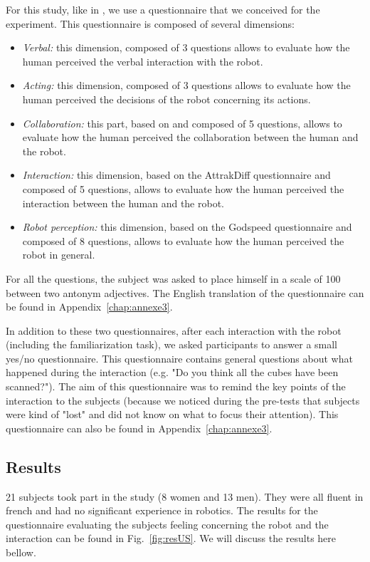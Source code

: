\documentclass[english,a4paper,11pt,twoside]{StyleThese}
\begin{document}
For this study, like in \cite{heerink2010relating, fischer2016between}, we use a questionnaire that we conceived for the experiment. This questionnaire is composed of several dimensions:
\begin{itemize}
\item \textit{Verbal:} this dimension, composed of 3 questions allows to evaluate how the human perceived the verbal interaction with the robot.
\item \textit{Acting:} this dimension, composed of 3 questions allows to evaluate how the human perceived the decisions of the robot concerning its actions.
\item \textit{Collaboration:} this part, based on \cite{weistroffer2014etude} and composed of 5 questions, allows to evaluate how the human perceived the collaboration between the human and the robot.
\item \textit{Interaction:} this dimension, based on the AttrakDiff questionnaire \cite{lallemand2015creation} and composed of 5 questions, allows to evaluate how the human perceived the interaction between the human and the robot.
\item \textit{Robot perception:} this dimension, based on the Godspeed questionnaire \cite{bartneck2009measurement} and composed of 8 questions, allows to evaluate how the human perceived the robot in general.
\end{itemize}
For all the questions, the subject was asked to place himself in a scale of 100 between two antonym adjectives. The English translation of the questionnaire can be found in Appendix~\ref{chap:annexe3}.

In addition to these two questionnaires, after each interaction with the robot (including the familiarization task), we asked participants to answer a small yes/no questionnaire. This questionnaire contains general questions about what happened during the interaction (e.g. "Do you think all the cubes have been scanned?"). The aim of this questionnaire was to remind the key points of the interaction to the subjects (because we noticed during the pre-tests that subjects were kind of "lost" and did not know on what to focus their attention). This questionnaire can also be found in Appendix~\ref{chap:annexe3}.

\subsection{Results}

21 subjects took part in the study (8 women and 13 men). They were all fluent in french and had no significant experience in robotics. The results for the questionnaire evaluating the subjects feeling concerning the robot and the interaction can be found in Fig.~\ref{fig:resUS}. We will discuss the results here bellow.
\end{document}
